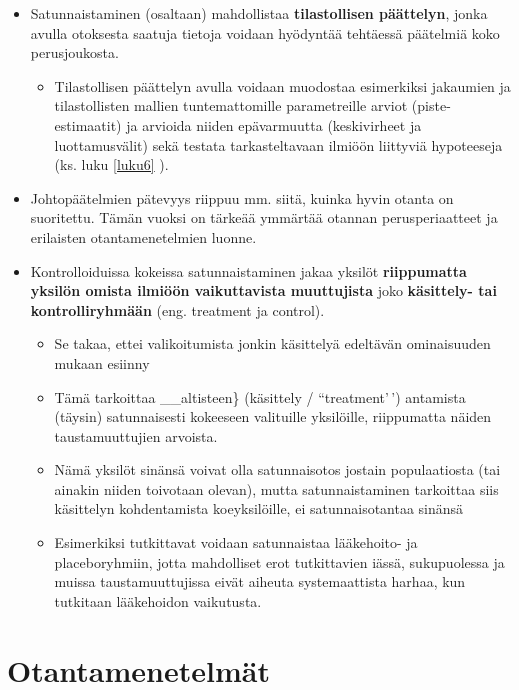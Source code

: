 \documentclass[
]{book}
\providecommand{\tightlist}{%
  \setlength{\itemsep}{0pt}\setlength{\parskip}{0pt}}
\begin{document}
\begin{itemize}
\item
  Satunnaistaminen (osaltaan) mahdollistaa \textbf{tilastollisen päättelyn}, jonka avulla otoksesta saatuja tietoja voidaan hyödyntää tehtäessä päätelmiä koko perusjoukosta.

  \begin{itemize}
  \tightlist
  \item
    Tilastollisen päättelyn avulla voidaan muodostaa esimerkiksi jakaumien ja tilastollisten mallien tuntemattomille parametreille arviot (piste-estimaatit) ja arvioida niiden epävarmuutta (keskivirheet ja luottamusvälit) sekä testata tarkasteltavaan ilmiöön liittyviä hypoteeseja (ks. luku \ref{luku6} ).
  \end{itemize}
\item
  Johtopäätelmien pätevyys riippuu mm. siitä, kuinka hyvin otanta on suoritettu. Tämän vuoksi on tärkeää ymmärtää otannan perusperiaatteet ja erilaisten otantamenetelmien luonne.
\item
  Kontrolloiduissa kokeissa satunnaistaminen jakaa yksilöt \textbf{riippumatta yksilön omista ilmiöön vaikuttavista muuttujista} joko \textbf{käsittely- tai kontrolliryhmään} (eng. treatment ja control).

  \begin{itemize}
  \tightlist
  \item
    Se takaa, ettei valikoitumista jonkin käsittelyä edeltävän ominaisuuden mukaan esiinny
  \item
    Tämä tarkoittaa \_\_altisteen\} (käsittely / ``treatment'\,') antamista (täysin) satunnaisesti kokeeseen valituille yksilöille, riippumatta näiden taustamuuttujien arvoista.
  \item
    Nämä yksilöt sinänsä voivat olla satunnaisotos jostain populaatiosta (tai ainakin niiden toivotaan olevan), mutta satunnaistaminen tarkoittaa siis käsittelyn kohdentamista koeyksilöille, ei satunnaisotantaa sinänsä
  \item
    Esimerkiksi tutkittavat voidaan satunnaistaa lääkehoito- ja placeboryhmiin, jotta mahdolliset erot tutkittavien iässä, sukupuolessa ja muissa taustamuuttujissa eivät aiheuta systemaattista harhaa, kun tutkitaan lääkehoidon vaikutusta.
  \end{itemize}
\end{itemize}

\hypertarget{alaluku55}{%
\section{Otantamenetelmät}\label{alaluku55}}
\end{document}
